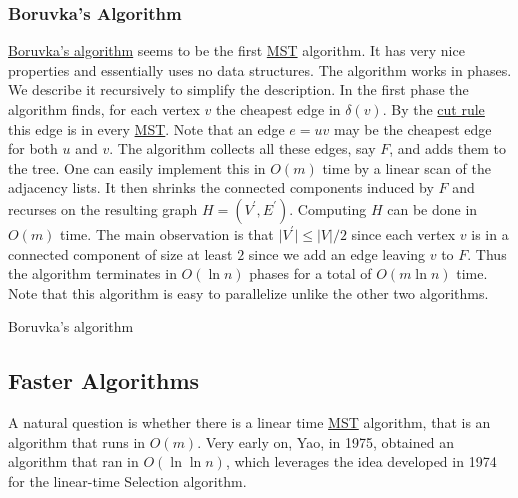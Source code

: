 \subsubsection{Boruvka's Algorithm}
\hyperref[algo:Boruvka]{Boruvka's algorithm} seems to be the first \hyperref[prb:MST]{MST} algorithm. It has very nice properties and essentially uses no data structures. The algorithm works in phases. We describe it recursively to simplify the description. In the first phase the algorithm finds, for each vertex \(v\) the cheapest edge in \(\delta (v)\). By the \hyperref[lma:cut-rule]{cut rule} this edge is in every \hyperref[prb:MST]{MST}. Note that an edge \(e = uv\) may be the cheapest edge for both \(u\) and \(v\). The algorithm collects all these edges, say \(F\), and adds them to the tree. One can easily implement this in \(O(m)\) time by a linear scan of the adjacency lists. It then shrinks the connected components induced by \(F\) and recurses on the resulting graph \(H = (V^{\prime}  , E^{\prime} )\). Computing \(H\) can be done in \(O(m)\) time. The main observation is that \(\lvert V^{\prime} \rvert \leq \lvert V \rvert / 2\) since each vertex \(v\) is in a connected component of size at least \(2\) since we add an edge leaving \(v\) to \(F\). Thus the algorithm terminates in \(O(\ln n)\) phases for a total of \(O(m \ln n)\) time. Note that this algorithm is easy to parallelize unlike the other two algorithms.

\begin{algorithm}[H]\label{algo:Boruvka}
	\DontPrintSemicolon
	\caption{Boruvka's algorithm}
	\BlankLine

\end{algorithm}

\subsection{Faster Algorithms}
A natural question is whether there is a linear time \hyperref[prb:MST]{MST} algorithm, that is an algorithm that runs in \(O(m)\). Very early on, Yao, in 1975, obtained an algorithm that ran in \(O(\ln \ln n)\)\cite{yao1975log}, which leverages the idea developed in 1974 for the linear-time Selection algorithm.

